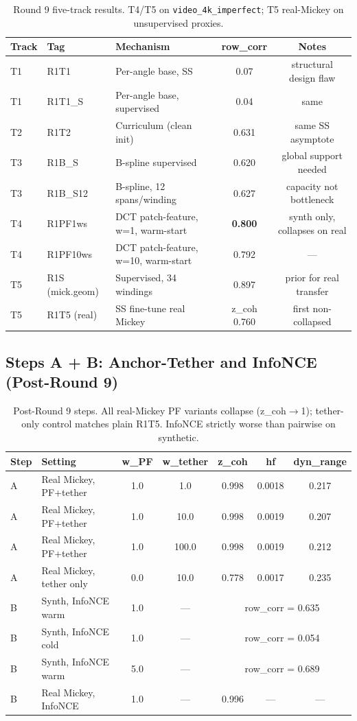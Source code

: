 \documentclass[11pt,a4paper]{article}
\begin{document}
\begin{table}[H]
\centering
\small
\begin{tabular}{lllcc}
\toprule
Track & Tag & Mechanism & row\_corr & Notes \\
\midrule
T1 & R1T1 & Per-angle base, SS & 0.07 & structural design flaw \\
T1 & R1T1\_S & Per-angle base, supervised & 0.04 & same \\
T2 & R1T2 & Curriculum (clean init) & 0.631 & same SS asymptote \\
T3 & R1B\_S & B-spline supervised & 0.620 & global support needed \\
T3 & R1B\_S12 & B-spline, 12 spans/winding & 0.627 & capacity not bottleneck \\
T4 & R1PF1ws & DCT patch-feature, w=1, warm-start & \textbf{0.800} & synth only, collapses on real \\
T4 & R1PF10ws & DCT patch-feature, w=10, warm-start & 0.792 & --- \\
T5 & R1S (mick.geom) & Supervised, 34 windings & 0.897 & prior for real transfer \\
T5 & R1T5 (real) & SS fine-tune real Mickey & z\_coh 0.760 & first non-collapsed \\
\bottomrule
\end{tabular}
\caption{Round 9 five-track results. T4/T5 on \texttt{video\_4k\_imperfect}; T5 real-Mickey on unsupervised proxies.}
\end{table}

\subsection{Steps A + B: Anchor-Tether and InfoNCE (Post-Round 9)}

\begin{table}[H]
\centering
\small
\begin{tabular}{llccccc}
\toprule
Step & Setting & w\_PF & w\_tether & z\_coh & hf & dyn\_range \\
\midrule
A & Real Mickey, PF+tether & 1.0 & 1.0 & 0.998 & 0.0018 & 0.217 \\
A & Real Mickey, PF+tether & 1.0 & 10.0 & 0.998 & 0.0019 & 0.207 \\
A & Real Mickey, PF+tether & 1.0 & 100.0 & 0.998 & 0.0019 & 0.212 \\
A & Real Mickey, tether only & 0.0 & 10.0 & 0.778 & 0.0017 & 0.235 \\
\midrule
B & Synth, InfoNCE warm & 1.0 & --- & \multicolumn{3}{c}{row\_corr = 0.635} \\
B & Synth, InfoNCE cold & 1.0 & --- & \multicolumn{3}{c}{row\_corr = 0.054} \\
B & Synth, InfoNCE warm & 5.0 & --- & \multicolumn{3}{c}{row\_corr = 0.689} \\
B & Real Mickey, InfoNCE & 1.0 & --- & 0.996 & --- & --- \\
\bottomrule
\end{tabular}
\caption{Post-Round 9 steps. All real-Mickey PF variants collapse (z\_coh$\to$1); tether-only control matches plain R1T5. InfoNCE strictly worse than pairwise on synthetic.}
\end{table}
\end{document}
